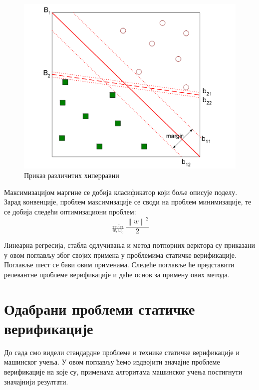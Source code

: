 \documentclass[a4paper]{article}
\newcommand{\norm}[1]{\left\lVert#1\right\rVert}
\begin{document}
{\begin{figure}[h!]
\begin{center}
\includegraphics[scale=0.4]{svn.png}
\end{center}
\caption{Приказ различитих хиперравни}
\label{fig:svm}
\end{figure}

Максимизацијом маргине се добија класификатор који боље описује поделу. Зарад конвенције, проблем максимизације се своди на проблем минимизације, те се добија следећи оптимизациони проблем:
\begin{equation}
    \min_{w, w_0} \frac{ {\norm{w}}^2 }{2}
\end{equation}


Линеарна регресија, стабла одлучивања и метод потпорних верктора су приказани у овом поглављу због својих примена у проблемима статичке верификације. Поглавље шест се бави овим применама. Следеће поглавље ће представити релевантне проблеме верификације и даће основ за примену ових метода.

\section{Одабрани проблеми статичке верификације}
До сада смо видели стандардне проблеме и технике статичке верификације и машинског учења. У овом поглављу ћемо издвојити значајне проблеме верификације на које су, применама алгоритама машинског учења постигнути значајнији резултати.


}
\end{document}
